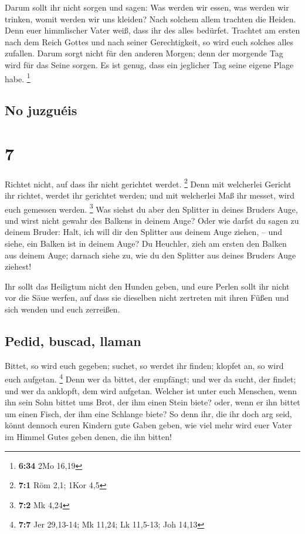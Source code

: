  Darum sollt ihr nicht sorgen und sagen: Was werden wir
essen, was werden wir trinken, womit werden wir uns kleiden?
 Nach solchem allem trachten die Heiden. Denn euer
himmlischer Vater weiß, dass ihr des alles bedürfet. 
Trachtet am ersten nach dem Reich Gottes und nach seiner Gerechtigkeit,
so wird euch solches alles zufallen.  Darum sorgt nicht
für den anderen Morgen; denn der morgende Tag wird für das Seine sorgen.
Es ist genug, dass ein jeglicher Tag seine eigene Plage habe.
\footnote{\textbf{6:34} 2Mo 16,19}

\hypertarget{no-juzguuxe9is}{%
\subsection{No juzguéis}\label{no-juzguuxe9is}}

\hypertarget{section-6}{%
\section{7}\label{section-6}}

 Richtet nicht, auf dass ihr nicht gerichtet werdet.
\footnote{\textbf{7:1} Röm 2,1; 1Kor 4,5}  Denn mit
welcherlei Gericht ihr richtet, werdet ihr gerichtet werden; und mit
welcherlei Maß ihr messet, wird euch gemessen werden. \footnote{\textbf{7:2}
  Mk 4,24}  Was siehst du aber den Splitter in deines
Bruders Auge, und wirst nicht gewahr des Balkens in deinem Auge?
 Oder wie darfst du sagen zu deinem Bruder: Halt, ich will
dir den Splitter aus deinem Auge ziehen, -- und siehe, ein Balken ist in
deinem Auge?  Du Heuchler, zieh am ersten den Balken aus
deinem Auge; darnach siehe zu, wie du den Splitter aus deines Bruders
Auge ziehest!

 Ihr sollt das Heiligtum nicht den Hunden geben, und eure
Perlen sollt ihr nicht vor die Säue werfen, auf dass sie dieselben nicht
zertreten mit ihren Füßen und sich wenden und euch zerreißen.

\hypertarget{pedid-buscad-llaman}{%
\subsection{Pedid, buscad, llaman}\label{pedid-buscad-llaman}}

 Bittet, so wird euch gegeben; suchet, so werdet ihr
finden; klopfet an, so wird euch aufgetan. \footnote{\textbf{7:7} Jer
  29,13-14; Mk 11,24; Lk 11,5-13; Joh 14,13}  Denn wer da
bittet, der empfängt; und wer da sucht, der findet; und wer da anklopft,
dem wird aufgetan.  Welcher ist unter euch Menschen, wenn
ihn sein Sohn bittet ums Brot, der ihm einen Stein biete?
 oder, wenn er ihn bittet um einen Fisch, der ihm eine
Schlange biete?  So denn ihr, die ihr doch arg seid,
könnt dennoch euren Kindern gute Gaben geben, wie viel mehr wird euer
Vater im Himmel Gutes geben denen, die ihn bitten!


